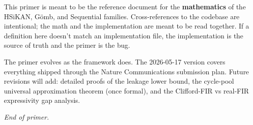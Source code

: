 \documentclass[11pt,a4paper]{article}
\theoremstyle{remark}
\newcommand{\GS}{G\"omb}
\begin{document}
This primer is meant to be the reference document for the
\textbf{mathematics} of the HSiKAN, \GS{}, and Sequential families.
Cross-references to the codebase are intentional; the math and
the implementation are meant to be read together. If a definition
here doesn't match an implementation file, the implementation is
the source of truth and the primer is the bug.

The primer evolves as the framework does. The 2026-05-17 version
covers everything shipped through the Nature Communications
submission plan. Future revisions will add: detailed proofs of
the leakage lower bound, the cycle-pool universal approximation
theorem (once formal), and the Clifford-FIR vs real-FIR
expressivity gap analysis.

\bigskip\bigskip
\hfill\emph{End of primer.}
\end{document}
